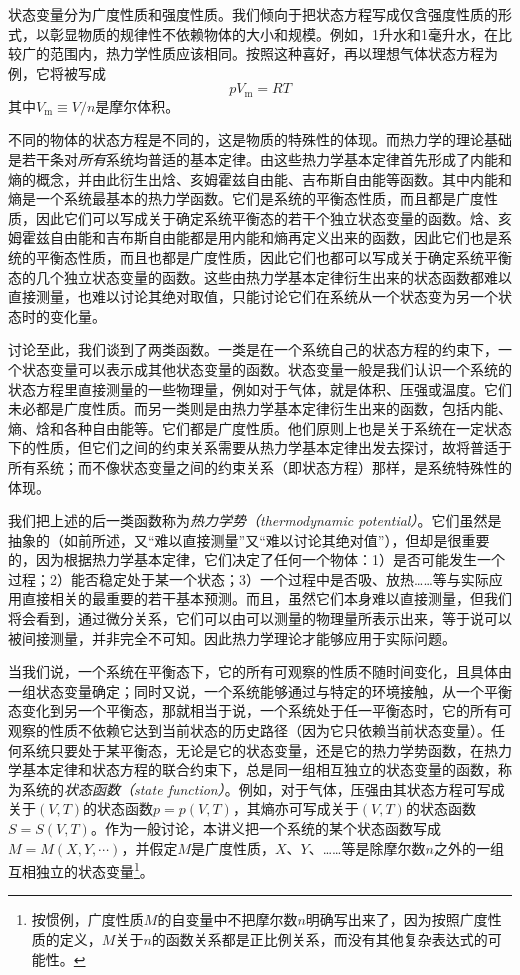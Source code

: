 \documentclass[main.tex]{subfiles}
\begin{document}
状态变量分为广度性质和强度性质。我们倾向于把状态方程写成仅含强度性质的形式，以彰显物质的规律性不依赖物体的大小和规模。例如，1升水和1毫升水，在比较广的范围内，热力学性质应该相同。按照这种喜好，再以理想气体状态方程为例，它将被写成
\[pV_\text{m}=RT\]
其中$V_\text{m}\equiv V/n$是摩尔体积。

不同的物体的状态方程是不同的，这是物质的特殊性的体现。而热力学的理论基础是若干条对\emph{所有}系统均普适的基本定律。由这些热力学基本定律首先形成了内能和熵的概念，并由此衍生出焓、亥姆霍兹自由能、吉布斯自由能等函数。其中内能和熵是一个系统最基本的热力学函数。它们是系统的平衡态性质，而且都是广度性质，因此它们可以写成关于确定系统平衡态的若干个独立状态变量的函数。焓、亥姆霍兹自由能和吉布斯自由能都是用内能和熵再定义出来的函数，因此它们也是系统的平衡态性质，而且也都是广度性质，因此它们也都可以写成关于确定系统平衡态的几个独立状态变量的函数。这些由热力学基本定律衍生出来的状态函数都难以直接测量，也难以讨论其绝对取值，只能讨论它们在系统从一个状态变为另一个状态时的变化量。

讨论至此，我们谈到了两类函数。一类是在一个系统自己的状态方程的约束下，一个状态变量可以表示成其他状态变量的函数。状态变量一般是我们认识一个系统的状态方程里直接测量的一些物理量，例如对于气体，就是体积、压强或温度。它们未必都是广度性质。而另一类则是由热力学基本定律衍生出来的函数，包括内能、熵、焓和各种自由能等。它们都是广度性质。他们原则上也是关于系统在一定状态下的性质，但它们之间的约束关系需要从热力学基本定律出发去探讨，故将普适于所有系统；而不像状态变量之间的约束关系（即状态方程）那样，是系统特殊性的体现。

我们把上述的后一类函数称为\emph{热力学势（thermodynamic potential）}。它们虽然是抽象的（如前所述，又“难以直接测量”又“难以讨论其绝对值”），但却是很重要的，因为根据热力学基本定律，它们决定了任何一个物体：1）是否可能发生一个过程；2）能否稳定处于某一个状态；3）一个过程中是否吸、放热……等与实际应用直接相关的最重要的若干基本预测。而且，虽然它们本身难以直接测量，但我们将会看到，通过微分关系，它们可以由可以测量的物理量所表示出来，等于说可以被间接测量，并非完全不可知。因此热力学理论才能够应用于实际问题。

当我们说，一个系统在平衡态下，它的所有可观察的性质不随时间变化，且具体由一组状态变量确定；同时又说，一个系统能够通过与特定的环境接触，从一个平衡态变化到另一个平衡态，那就相当于说，一个系统处于任一平衡态时，它的所有可观察的性质不依赖它达到当前状态的历史路径（因为它只依赖当前状态变量）。任何系统只要处于某平衡态，无论是它的状态变量，还是它的热力学势函数，在热力学基本定律和状态方程的联合约束下，总是同一组相互独立的状态变量的函数，称为系统的\emph{状态函数（state function）}。例如，对于气体，压强由其状态方程可写成关于$\left(V,T\right)$的状态函数$p=p\left(V,T\right)$，其熵亦可写成关于$\left(V,T\right)$的状态函数$S=S\left(V,T\right)$。作为一般讨论，本讲义把一个系统的某个状态函数写成$M=M\left(X,Y,\cdots\right)$，并假定$M$是广度性质，$X$、$Y$、……等是除摩尔数$n$之外的一组互相独立的状态变量\footnote{按惯例，广度性质$M$的自变量中不把摩尔数$n$明确写出来了，因为按照广度性质的定义，$M$关于$n$的函数关系都是正比例关系，而没有其他复杂表达式的可能性。}。
\end{document}
